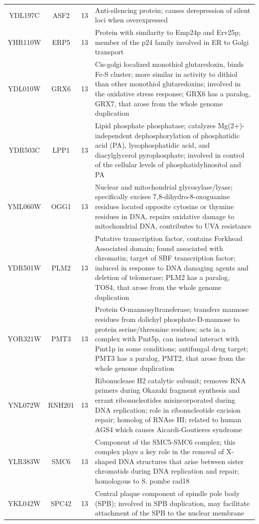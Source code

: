 \documentclass[]{article}
\begin{document}
\begin{longtable}{@{\extracolsep{3pt}} cccp{85mm}}
YDL197C & ASF2 & 13 & Anti-silencing protein; causes derepression of silent loci when overexpressed \\ 
YHR110W & ERP5 & 13 & Protein with similarity to Emp24p and Erv25p; member of the p24 family involved in ER to Golgi transport \\ 
YDL010W & GRX6 & 13 & Cis-golgi localized monothiol glutaredoxin, binds Fe-S cluster; more similar in activity to dithiol than other monothiol glutaredoxins; involved in the oxidative stress response; GRX6 has a paralog, GRX7, that arose from the whole genome duplication \\ 
YDR503C & LPP1 & 13 & Lipid phosphate phosphatase; catalyzes Mg(2+)-independent dephosphorylation of phosphatidic acid (PA), lysophosphatidic acid, and diacylglycerol pyrophosphate; involved in control of the cellular levels of phosphatidylinositol and PA \\ 
YML060W & OGG1 & 13 & Nuclear and mitochondrial glycosylase/lyase; specifically excises 7,8-dihydro-8-oxoguanine residues located opposite cytosine or thymine residues in DNA, repairs oxidative damage to mitochondrial DNA, contributes to UVA resistance \\ 
YDR501W & PLM2 & 13 & Putative transcription factor, contains Forkhead Associated domain; found associated with chromatin; target of SBF transcription factor; induced in response to DNA damaging agents and deletion of telomerase; PLM2 has a paralog, TOS4, that arose from the whole genome duplication \\ 
YOR321W & PMT3 & 13 & Protein O-mannosyltransferase; transfers mannose residues from dolichyl phosphate-D-mannose to protein serine/threonine residues; acts in a complex with Pmt5p, can instead interact with Pmt1p in some conditions; antifungal drug target; PMT3 has a paralog, PMT2, that arose from the whole genome duplication \\ 
YNL072W & RNH201 & 13 & Ribonuclease H2 catalytic subunit; removes RNA primers during Okazaki fragment synthesis and errant ribonucleotides misincorporated during DNA replication; role in ribonucleotide excision repair; homolog of RNAse HI; related to human AGS4 which causes Aicardi-Goutieres syndrome \\ 
YLR383W & SMC6 & 13 & Component of the SMC5-SMC6 complex; this complex plays a key role in the removal of X-shaped DNA structures that arise between sister chromatids during DNA replication and repair; homologous to S. pombe rad18 \\ 
YKL042W & SPC42 & 13 & Central plaque component of spindle pole body (SPB); involved in SPB duplication, may facilitate attachment of the SPB to the nuclear membrane \\ 

\end{longtable}
\end{document}
